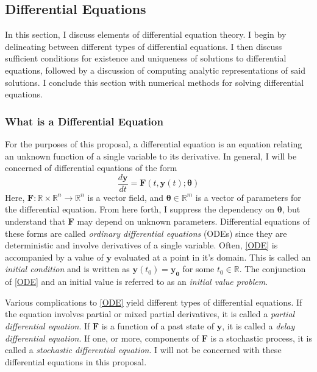 \subsection{Differential Equations}\label{sec:ODE}

In this section, I discuss elements of differential equation theory.  I begin by delineating between different types of differential equations.  I then discuss sufficient conditions for existence and uniqueness of solutions to differential equations, followed by a discussion of computing analytic representations of said solutions.  I conclude this section with numerical methods for solving differential equations.

\subsubsection{What is a Differential Equation}

For the purposes of this proposal, a differential equation is an equation relating an unknown function of a single variable to its derivative. In general, I will be concerned of differential equations of the form
%
\begin{equation}\label{ODE}
\dfrac{d \mathbf{y}}{dt}  = \mathbf{F}(t,\mathbf{y}(t);\bm{\theta})
\end{equation}
%
Here, $ \mathbf{F} : \mathbb{R} \times \mathbb{R}^n \rightarrow \mathbb{R}^n $ is a vector field, and $ \bm{\theta} \in \mathbb{R}^m $ is a vector of parameters for the differential equation.  From here forth, I suppress the dependency on $ \bm{\theta} $, but understand that $ \mathbf{F} $ may depend on unknown parameters. Differential equations of these forms are called \textit{ordinary differential equations} (ODEs) since they are deterministic and involve derivatives of a single variable.  Often, \cref{ODE} is accompanied by a value of $ \mathbf{y} $  evaluated at a point in it's domain.  This is called an \textit{initial condition} and is written as $ \mathbf{y}(t_0) = \mathbf{y_0} $ for some $ t_0 \in \mathbb{R}$.  The conjunction of \cref{ODE} and an initial value is referred to as an \textit{initial value problem}.

Various complications to \cref{ODE} yield different types of differential equations. If the equation involves partial or mixed partial derivatives, it is called a \textit{partial differential equation}.  If $ \mathbf{F} $ is a function of a past state of $ \mathbf{y} $, it is called a \textit{delay differential equation}.  If one, or more, components of $ \mathbf{F} $ is a stochastic process, it is called a \textit{stochastic differential equation}.  I will not be concerned with these differential equations in this proposal.

